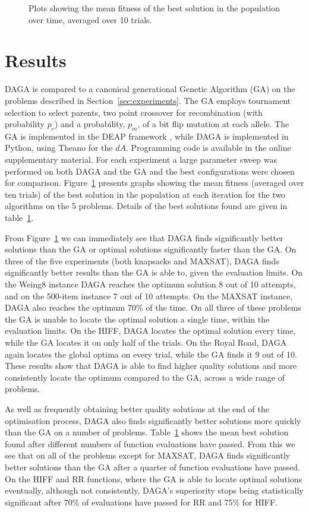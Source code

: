 \documentclass[runningheads,a4paper]{llncs}
\begin{document}
\begin{figure}[!]
\caption[Optional caption for list of figures]{Plots showing the mean fitness of the best solution in the population over time, averaged over 10 trials.}
\label{figure:experiment_subplots}
\end{figure}

\section{Results}

DAGA is compared to a canonical generational Genetic Algorithm (GA) on the problems described in Section~\ref{sec:experiments}. The GA employs tournament selection to select parents, two point crossover for recombination (with probability \(p_c\)) and a probability, \(p_m\), of a bit flip mutation at each allele. The GA is implemented in the DEAP framework \cite{deap}, while DAGA is implemented in Python, using Theano for the \(dA\). Programming code is available in the online supplementary material.  For each experiment a large parameter sweep was performed on both DAGA and the GA and the best configurations were chosen for comparison. Figure~\ref{figure:experiment_subplots} presents graphs showing the mean fitness (averaged over ten trials) of the best solution in the population at each iteration for the two algorithms on the 5 problems. Details of the best solutions found are given in table~\ref{}.

From Figure~\ref{figure:experiment_subplots}  we can immediately see that DAGA finds significantly better solutions than the GA or optimal solutions significantly faster than the GA. On three of the five experiments (both knapsacks and MAXSAT), DAGA finds significantly better results than the GA is able to, given the evaluation limits. On the Weing8 instance DAGA reaches the optimum solution 8 out of 10 attempts, and on the 500-item instance 7 out of 10 attempts. On the MAXSAT instance, DAGA also reaches the optimum 70\% of the time. On all three of these problems the GA is unable to locate the optimal solution a single time, within the evaluation limits. On the HIFF, DAGA locates the optimal solution every time, while the GA locates it on only half of the trials. On the Royal Road, DAGA again locates the global optima on every trial, while the GA finds it 9 out of 10. These results show that DAGA is able to find higher quality solutions and more consistently locate the optimum compared to the GA, across a wide range of problems.

As well as frequently obtaining better quality solutions at the end of the optimisation process, DAGA also finds significantly better solutions more quickly than the GA on a number of problems. Table~\ref{} shows the mean best solution found after different numbers of function evaluations have passed. From this we see that on all of the problems except for MAXSAT, DAGA finds significantly better solutions than the GA after a quarter of function evaluations have passed. On the HIFF and RR functions, where the GA is able to locate optimal solutions eventually, although not consistently, DAGA's superiority stops being statistically significant after 70\% of evaluations have passed for RR and 75\% for HIFF.
\end{document}
